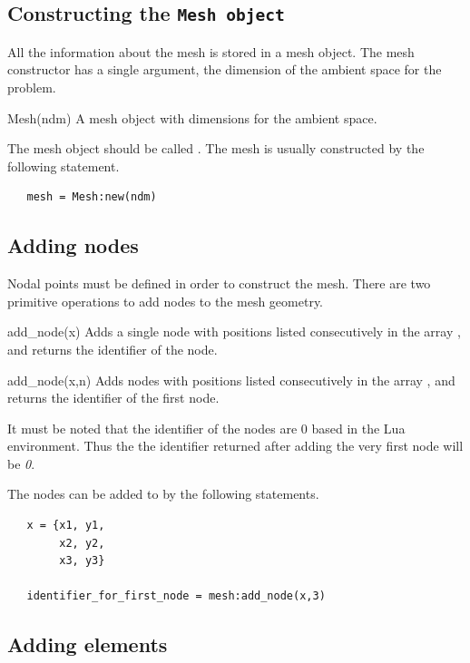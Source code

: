 \clearpage
\subsection{Constructing the \tt{Mesh} object}

All the information about the mesh is stored in a 
mesh object. The mesh constructor has a single argument,
the dimension of the ambient space for the problem. 
\begin{codelist}
  \item{Mesh(ndm)} A mesh object with  dimensions
  for the ambient space. 
\end{codelist}
The mesh object should be called . The mesh is
usually constructed by the following statement.
\begin{verbatim}
   mesh = Mesh:new(ndm)
\end{verbatim}

\subsection{Adding nodes}
Nodal points must be defined in order to construct the mesh.
There are two primitive operations to add nodes to the mesh geometry.
\begin{codelist}

  \item[add\_node(x)]
    Adds a single node with positions listed consecutively in the
    array , and returns the identifier of the node.
  \item[add\_node(x,n)]
    Adds  nodes with positions listed consecutively in the
    array , and returns the 
    identifier of the first node.

\end{codelist}
It must be noted that the identifier of the nodes are 0 based in the
Lua environment. Thus the the identifier returned after adding the
very first node will be \emph{0}.

The nodes can be added to  by the following statements.
\begin{verbatim}
   x = {x1, y1,
        x2, y2,
        x3, y3}

   identifier_for_first_node = mesh:add_node(x,3)
\end{verbatim}

\subsection{Adding elements}
